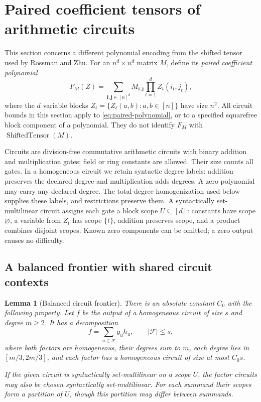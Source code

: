 \documentclass[11pt]{article}
\newtheorem{lemma}[theorem]{Lemma}
\theoremstyle{definition}
\theoremstyle{remark}
\begin{document}
\section{Paired coefficient tensors of arithmetic circuits}
\label{sec:circuits}

This section concerns a different polynomial encoding from the shifted
tensor used by Rossman and Zhu.  For an $n^d\times n^d$ matrix $M$, define
its \emph{paired coefficient polynomial}
\begin{equation}
\label{eq:paired-polynomial}
 F_M(Z)=\sum_{\mathbf i,\mathbf j\in[n]^d}
 M_{\mathbf i,\mathbf j}\prod_{t=1}^d Z_t(i_t,j_t),
\end{equation}
where the $d$ variable blocks $Z_t=\{Z_t(a,b):a,b\in[n]\}$
have size $n^2$.  All circuit bounds in this section apply to
\eqref{eq:paired-polynomial}, or to a specified squarefree
block component of a polynomial.  They do not identify
$F_M$ with $\operatorname{ShiftedTensor}(M)$.

Circuits are division-free commutative arithmetic circuits with binary
addition and multiplication gates; field or ring constants are allowed.
Their size counts all gates. In a homogeneous circuit we retain
syntactic degree labels: addition preserves the declared degree and
multiplication adds degrees. A zero polynomial may carry any declared
degree. The total-degree homogenization used below supplies these
labels, and restrictions preserve them. A syntactically set-multilinear circuit
assigns each gate a block scope $U\subseteq[d]$: constants have scope
$\varnothing$, a variable from $Z_t$ has scope $\{t\}$, addition
preserves scope, and a product combines disjoint scopes.  Known zero
components can be omitted; a zero output causes no difficulty.

\subsection{A balanced frontier with shared circuit contexts}

\begin{lemma}[Balanced circuit frontier]
\label{lem:circuit-frontier}
There is an absolute constant $C_0$ with the following property.
Let $f$ be the output of a homogeneous circuit of size $s$ and
degree $m\ge2$.  It has a decomposition
\begin{equation}
\label{eq:circuit-frontier}
 f=\sum_{u\in\mathcal F}g_u h_u,
 \qquad |\mathcal F|\le s,
\end{equation}
where both factors are homogeneous, their degrees sum to $m$,
each degree lies in $[m/3,2m/3]$, and each factor has a homogeneous
circuit of size at most $C_0s$.

If the given circuit is syntactically set-multilinear on a scope $U$,
the factor circuits may also be chosen syntactically set-multilinear.
For each summand their scopes form a partition of $U$, though this
partition may differ between summands.
\end{lemma}
\end{document}
